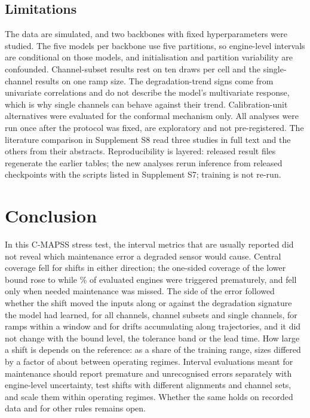 \documentclass[11pt,a4paper]{article}
\begin{document}
\subsection{Limitations}
The data are simulated, and two backbones with fixed hyperparameters were studied. The five models per backbone use five partitions, so engine-level intervals are conditional on those models, and initialisation and partition variability are confounded. Channel-subset results rest on ten draws per cell and the single-channel results on one ramp size. The degradation-trend signs come from univariate correlations and do not describe the model's multivariate response, which is why single channels can behave against their trend. Calibration-unit alternatives were evaluated for the conformal mechanism only. All analyses were run once after the protocol was fixed, are exploratory and not pre-registered. The literature comparison in Supplement S8 read three studies in full text and the others from their abstracts. Reproducibility is layered: released result files regenerate the earlier tables; the new analyses rerun inference from released checkpoints with the scripts listed in Supplement S7; training is not re-run.

\section{Conclusion}
In this C-MAPSS stress test, the interval metrics that are usually reported did not reveal which maintenance error a degraded sensor would cause. Central coverage fell for shifts in either direction; the one-sided coverage of the lower bound rose to \RVCovTwo{} while \RVPremTwo\% of evaluated engines were triggered prematurely, and fell only when needed maintenance was missed. The side of the error followed whether the shift moved the inputs along or against the degradation signature the model had learned, for all channels, channel subsets and single channels, for ramps within a window and for drifts accumulating along trajectories, and it did not change with the bound level, the tolerance band or the lead time. How large a shift is depends on the reference: as a share of the training range, sizes differed by a factor of about \RVRatioFactor{} between operating regimes. Interval evaluations meant for maintenance should report premature and unrecognised errors separately with engine-level uncertainty, test shifts with different alignments and channel sets, and scale them within operating regimes. Whether the same holds on recorded data and for other rules remains open.
\end{document}
